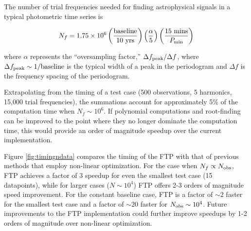 \documentclass[apj]{emulateapj}
\begin{document}
The number of trial frequencies needed for finding astrophysical signals in a typical photometric time series is

\begin{equation}
N_f = 1.75 \times 10^6 \left(\frac{{\rm baseline}}{10~{\rm yrs}}\right)\left(\frac{\alpha}{5}\right)\left(\frac{15~{\rm mins}}{P_{\rm min}}\right)
\end{equation}

\noindent where $\alpha$ represents the ``oversampling factor,'' $\Delta f_{\rm peak} / \Delta f$, where $\Delta f_{\rm peak} \sim 1/{\rm baseline}$ is
the typical width of a peak in the periodogram and $\Delta f$ is the frequency spacing of the periodogram.

Extrapolating from the timing of a test case (500 observations, 5 harmonics, 15,000 trial frequencies), the summations
account for approximately 5\% of the computation time when $N_f \sim 10^6$. If polynomial computations and
root-finding can be improved to the point where they no longer dominate the computation time, this would provide an
order of magnitude speedup over the current implementation.

Figure \ref{fig:timingndata} compares the timing of the FTP with that of previous methods that employ
non-linear optimization. For the case when $N_f\propto N_{\rm obs}$, FTP achieves a factor of 3 speedup for even 
the smallest test case (15 datapoints), while for larger cases ($N\sim10^4$) FTP offers 2-3 orders of magnitude 
speed improvement. For the constant baseline case, FTP is a factor of $\sim 2$ faster for the smallest test case
and a factor of $\sim 20$ faster for $N_{\rm obs}\sim 10^4$. Future improvements to the FTP implementation
could further improve speedups by 1-2 orders of magnitude over non-linear optimization.


%

% 
\end{document}
